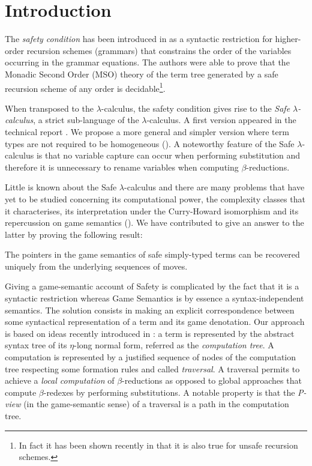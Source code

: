 \documentclass{llncs}
\begin{document}
\section{Introduction}

The \emph{safety condition} has been introduced in \cite{KNU02} as a
syntactic restriction for higher-order recursion schemes (grammars)
that constrains the order of the variables occurring in the grammar
equations. The authors were able to prove that the Monadic Second
Order (MSO) theory of the term tree generated by a safe recursion
scheme of any order is decidable\footnote{In fact it has been shown
recently in \cite{OngLics2006} that it is also true for unsafe
recursion schemes.}.

When transposed to the $\lambda$-calculus, the safety condition
gives rise to the \emph{Safe $\lambda$-calculus}, a strict
sub-language of the $\lambda$-calculus. A first version appeared in
the technical report \cite{safety-mirlong2004}. We propose a more
general and simpler version where term types are not required to be
homogeneous (\cite{blumtransfer}). A noteworthy feature of the Safe
$\lambda$-calculus is that no variable capture can occur when
performing substitution and therefore it is unnecessary to rename
variables when computing $\beta$-reductions.

Little is known about the Safe $\lambda$-calculus and there are many
 problems that have yet to be studied concerning its
computational power, the complexity classes that it characterises,
its interpretation under the Curry-Howard isomorphism and its
repercussion on game semantics
(\cite{abramsky:game-semantics-tutorial}). We have contributed to
give an answer to the latter by proving the following result:
\begin{thm}
\label{thm:safeptrrecover} The pointers in the game semantics of
safe simply-typed terms can be recovered uniquely from the
underlying sequences of moves.
\end{thm}

Giving a game-semantic account of Safety is complicated by the fact
that it is a syntactic restriction whereas Game Semantics is by
essence a syntax-independent semantics. The solution consists in
making an explicit correspondence between some syntactical
representation of a term and its game denotation. Our approach is
based on ideas recently introduced in \cite{OngLics2006}: a term is
represented by the abstract syntax tree of its $\eta$-long normal
form, referred as the \emph{computation tree}. A computation is
represented by a justified sequence of nodes of the computation tree
respecting some formation rules and called \emph{traversal}. A
traversal permits to achieve a \emph{local computation} of
$\beta$-reductions as opposed to global approaches that compute
$\beta$-redexes by performing substitutions. A notable property is
that the \emph{P-view} (in the game-semantic sense) of a traversal
is a path in the computation tree.
\end{document}
